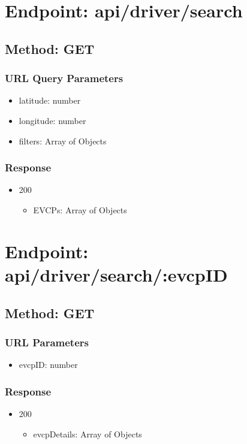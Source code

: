 \section*{Endpoint: api/driver/search}
\subsection*{Method: GET}
\subsubsection*{URL Query Parameters}
\begin{itemize}
    \item latitude: number
    \item longitude: number
    \item filters: Array of Objects
\end{itemize}
\subsubsection*{Response}
\begin{itemize}
    \item 200
          \begin{itemize}
              \item EVCPs: Array of Objects
          \end{itemize}
\end{itemize}

\section*{Endpoint: api/driver/search/:evcpID}
\subsection*{Method: GET}
\subsubsection*{URL Parameters}
\begin{itemize}
    \item evcpID: number
\end{itemize}
\subsubsection*{Response}
\begin{itemize}
    \item 200
          \begin{itemize}
              \item evcpDetails: Array of Objects
          \end{itemize}
\end{itemize}

